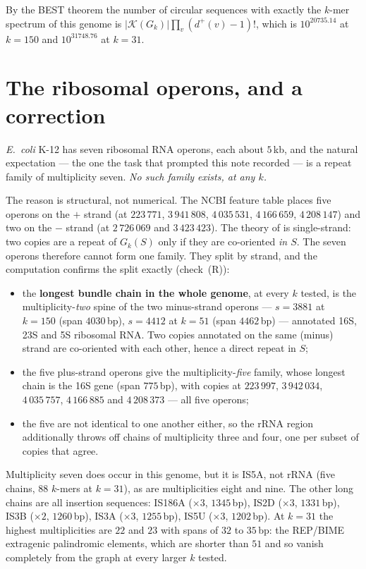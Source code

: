 \documentclass[11pt]{article}
\theoremstyle{plain}
\theoremstyle{definition}
\theoremstyle{remark}
\newcommand{\K}{\mathcal{K}}
\begin{document}
By the BEST theorem the number of circular sequences with exactly the $k$-mer spectrum of
this genome is $|\K(G_k)|\prod_v(d^{+}(v)-1)!$, which is $10^{20735.14}$ at $k=150$ and
$10^{31748.76}$ at $k=31$.

\section{The ribosomal operons, and a correction}\label{sec:rrna}

\emph{E.\ coli} K-12 has seven ribosomal RNA operons, each about $5$\,kb, and the natural
expectation --- the one the task that prompted this note recorded --- is a repeat family
of multiplicity seven. \emph{No such family exists, at any $k$.}

The reason is structural, not numerical. The NCBI feature table places five operons on
the $+$ strand (at $223\,771$, $3\,941\,808$, $4\,035\,531$, $4\,166\,659$, $4\,208\,147$)
and two on the $-$ strand (at $2\,726\,069$ and $3\,423\,423$). The theory of
\cite{Bio1,Bio2,Bio3,Bio4} is single-strand: two copies are a repeat of $G_k(S)$ only if
they are co-oriented \emph{in $S$}. The seven operons therefore cannot form one family.
They split by strand, and the computation confirms the split exactly (check~(R)):

\begin{itemize}
\item the \textbf{longest bundle chain in the whole genome}, at every $k$ tested, is the
multiplicity-\emph{two} spine of the two minus-strand operons --- $s=3881$ at $k=150$
(span $4030$\,bp), $s=4412$ at $k=51$ (span $4462$\,bp) --- annotated 16S, 23S and 5S
ribosomal RNA. Two copies annotated on the same (minus) strand are co-oriented with each
other, hence a direct repeat in $S$;
\item the five plus-strand operons give the multiplicity-\emph{five} family, whose longest
chain is the 16S gene (span $775$\,bp), with copies at $223\,997$, $3\,942\,034$,
$4\,035\,757$, $4\,166\,885$ and $4\,208\,373$ --- all five operons;
\item the five are not identical to one another either, so the rRNA region additionally
throws off chains of multiplicity three and four, one per subset of copies that agree.
\end{itemize}

Multiplicity seven does occur in this genome, but it is IS5A, not rRNA (five chains,
$88$ $k$-mers at $k=31$), as are multiplicities eight and nine. The other long chains are
all insertion sequences: IS186A ($\times3$, $1345$\,bp), IS2D ($\times3$, $1331$\,bp),
IS3B ($\times2$, $1260$\,bp), IS3A ($\times3$, $1255$\,bp), IS5U ($\times3$, $1202$\,bp).
At $k=31$ the highest multiplicities are $22$ and $23$ with spans of $32$ to $35$\,bp:
the REP/BIME extragenic palindromic elements, which are shorter than $51$ and so vanish
completely from the graph at every larger $k$ tested.
\end{document}
